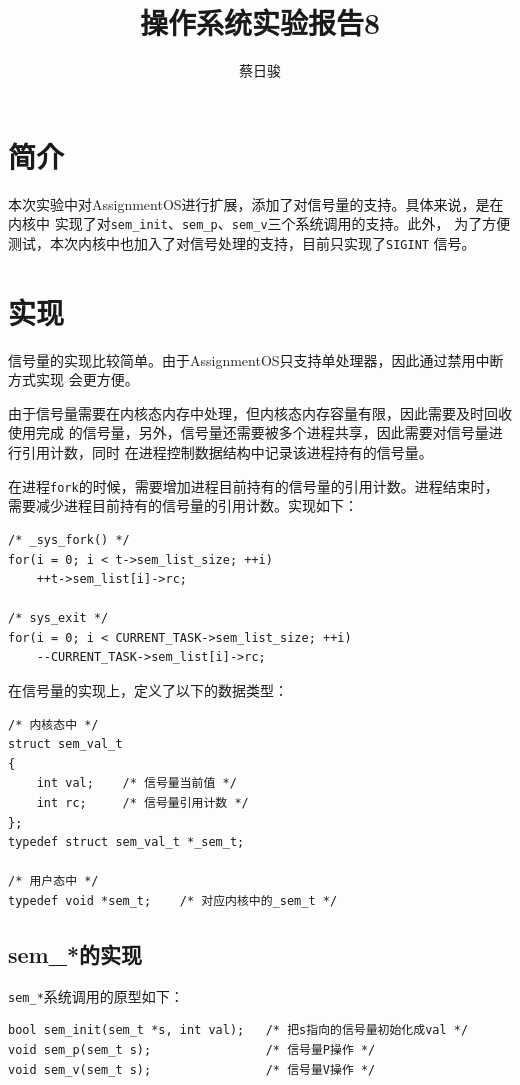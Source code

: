 \documentclass[a4paper, adobefonts]{ctexart}
\title{操作系统实验报告8}
\author{蔡日骏\quad12348003}
\begin{document}
\maketitle

\section{简介}
本次实验中对AssignmentOS进行扩展，添加了对信号量的支持。具体来说，是在内核中
实现了对\verb|sem_init|、\verb|sem_p|、\verb|sem_v|三个系统调用的支持。此外，
为了方便测试，本次内核中也加入了对信号处理的支持，目前只实现了\verb|SIGINT|
信号。

\section{实现}
信号量的实现比较简单。由于AssignmentOS只支持单处理器，因此通过禁用中断方式实现
会更方便。

由于信号量需要在内核态内存中处理，但内核态内存容量有限，因此需要及时回收使用完成
的信号量，另外，信号量还需要被多个进程共享，因此需要对信号量进行引用计数，同时
在进程控制数据结构中记录该进程持有的信号量。

在进程\verb|fork|的时候，需要增加进程目前持有的信号量的引用计数。进程结束时，
需要减少进程目前持有的信号量的引用计数。实现如下：

\begin{verbatim}
/* _sys_fork() */
for(i = 0; i < t->sem_list_size; ++i)
    ++t->sem_list[i]->rc;

/* sys_exit */
for(i = 0; i < CURRENT_TASK->sem_list_size; ++i)
    --CURRENT_TASK->sem_list[i]->rc;
\end{verbatim}

在信号量的实现上，定义了以下的数据类型：

\begin{verbatim}
/* 内核态中 */
struct sem_val_t
{
    int val;    /* 信号量当前值 */
    int rc;     /* 信号量引用计数 */
};
typedef struct sem_val_t *_sem_t;

/* 用户态中 */
typedef void *sem_t;    /* 对应内核中的_sem_t */
\end{verbatim}

\subsection{sem\_*的实现}
\verb|sem_*|系统调用的原型如下：

\begin{verbatim}
bool sem_init(sem_t *s, int val);   /* 把s指向的信号量初始化成val */
void sem_p(sem_t s);                /* 信号量P操作 */
void sem_v(sem_t s);                /* 信号量V操作 */
\end{verbatim}
\end{document}
